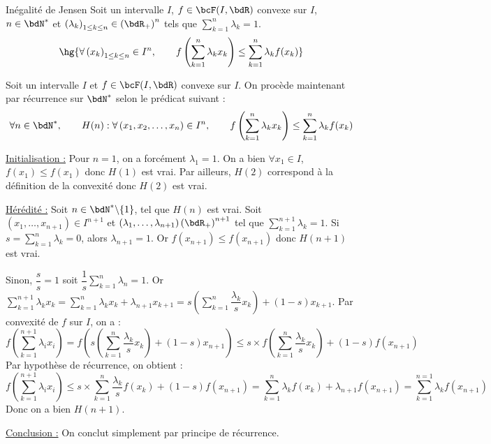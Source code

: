 \documentclass[a4paper,french,bookmarks]{article}
\begin{document}
\begin{theorem}{Inégalité de Jensen}{}
    Soit un intervalle $I$, $f \in \bcF(I, \bdR)$ convexe sur $I$, $n \in \bdN^*$ et $\left(\lambda_k\right)_{1 \leq k \leq n} \in \left(\bdR_+\right)^n$ tels que $ \sum_{k=1}^n \lambda_k = 1$.
    \[ \hg{\forall \left(x_k\right)_{1 \leq k \leq n} \in I^n,\qquad f\left(\sum_{k=1}^n \lambda_kx_k\right) \leq \sum_{k=1}^n \lambda_kf(x_k)}\]
\end{theorem}

\begin{nproof}
    Soit un intervalle $I$ et $f \in \bcF(I, \bdR)$ convexe sur $I$. On procède maintenant par récurrence sur $\bdN^*$ selon le prédicat suivant :
    \[ \forall n \in \bdN^*,\qquad H(n) : \forall \left(x_1, x_2, \dots, x_n\right) \in I^n,\qquad f\left(\sum_{k=1}^n \lambda_kx_k\right) \leq \sum_{k=1}^n \lambda_kf(x_k)\]
    \begin{enumerate}
        \itt \underline{Initialisation :} Pour $n=1$, on a forcément $\lambda_1 = 1$. On a bien $\forall x_1 \in I$, $f(x_1) \leq f(x_1)$ donc $H(1)$ est vrai. Par ailleurs, $H(2)$ correspond à la définition de la convexité donc $H(2)$ est vrai.
            
        \itt \underline{Hérédité :} Soit $n \in \bdN^* \backslash \{ 1 \}$, tel que $H(n)$ est vrai. Soit $\left(x_1, \dots, x_{n+1}\right) \in I^{n+1}$ et $\left(\lambda_1, \dots, \lambda_{n+1}\right) \left(\bdR_+\right)^{n+1}$ tel que $\displaystyle\sum_{k=1}^{n+1} \lambda_k = 1$. Si $s = \displaystyle\sum_{k=1}^n \lambda_k = 0$, alors $\lambda_{n+1} = 1$. Or  $f(x_{n+1}) \leq f(x_{n+1})$ donc $H(n+1)$ est vrai.
            
        Sinon, $\dfrac{s}{s} = 1$ soit $\dfrac{1}{s}\displaystyle\sum_{k=1}^n \lambda_n = 1$. Or $\displaystyle \sum_{k=1}^{n+1} \lambda_kx_k = \sum_{k=1}^{n} \lambda_kx_k + \lambda_{n+1}x_{k+1} = s\left(\sum_{k=1}^{n} \dfrac{\lambda_k}{s}x_k\right) + (1-s)x_{k+1}$. Par convexité de $f$ sur $I$, on a :
        \[ f\left(\sum_{k=1}^{n+1} \lambda_ix_i\right) = f\left( s\left(\sum_{k=1}^{n} \dfrac{\lambda_k}{s}x_k\right) + (1-s)x_{n+1}\right) \leq s\times f\left(\sum_{k=1}^n \dfrac{\lambda_k}{s}x_k\right) + (1-s)f(x_{n+1})\]
        Par hypothèse de récurrence, on obtient :
        \[ f\left(\sum_{k=1}^{n+1} \lambda_ix_i\right) \leq s\times \sum_{k=1}^n \dfrac{\lambda_k}{s}f\left(x_k\right) + (1-s)f(x_{n+1}) = \sum_{k=1}^n \lambda_kf(x_k) + \lambda_{n+1}f(x_{n+1}) = \sum_{k=1}^{n=1}\lambda_kf(x_{n+1})\]
        Donc on a bien $H(n+1)$.
            
        \itt \underline{Conclusion :} On conclut simplement par principe de récurrence.
    \end{enumerate}
\end{nproof}
\end{document}
